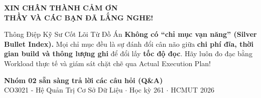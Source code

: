 \documentclass[aspectratio=169,9pt]{beamer}
\begin{document}
\begin{frame}
\centering
\vspace{0.8cm}
{\Huge\textbf{\color{hcmutblue}XIN CHÂN THÀNH CẢM ƠN}}\\[0.3cm]
{\Large\textbf{THẦY VÀ CÁC BẠN ĐÃ LẮNG NGHE!}}\\[0.8cm]

\begin{alertblock}{Thông Điệp Kỹ Sư Cốt Lõi Từ Đồ Án}
\centering
\textbf{Không có ``chỉ mục vạn năng'' (Silver Bullet Index).} Mọi chỉ mục đều là sự đánh đổi cân não giữa \textbf{chi phí đĩa, thời gian build và thông lượng ghi} để đổi lấy \textbf{tốc độ đọc}. Hãy luôn đo đạc bằng Workload thực tế và giám sát chặt chẽ qua Actual Execution Plan!
\end{alertblock}

\vspace{0.5cm}
{\large\textbf{\color{accentblue}Nhóm 02 sẵn sàng trả lời các câu hỏi (Q\&A)}}\\[0.2cm]
\footnotesize CO3021 - Hệ Quản Trị Cơ Sở Dữ Liệu $\cdot$ Học kỳ 261 $\cdot$ HCMUT 2026
\end{frame}
\end{document}
